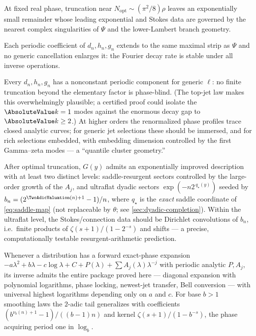 \documentclass[11pt,oneside]{article}
\numberwithin{equation}{section}
\theoremstyle{definition}
\theoremstyle{remark}
\begin{document}
\begin{conjecture}
\label{conj:optimal-truncation}
At fixed real phase, truncation near
$N_{\mathrm{opt}}\sim(\pi^{2}/8)\rho$ leaves an exponentially small
remainder whose leading exponential and Stokes data are governed by
the nearest complex singularities of $\Psi$ and the lower-Lambert
branch geometry.
\end{conjecture}

\begin{conjecture}
\label{conj:strip-sharp}
Each periodic coefficient of $d_n,h_n,g_n$ extends to the same
maximal strip as $\Psi$ and no generic cancellation enlarges it: the
Fourier decay rate is stable under all inverse operations.
\end{conjecture}

\begin{conjecture}
\label{conj:nonconstant-phase}
Every $d_n,h_n,g_n$ has a nonconstant periodic component for generic
$\ell$: no finite truncation beyond the elementary factor is
phase-blind.  (The top-jet law makes this overwhelmingly plausible;
a certified proof could isolate the $\AbsoluteValue k=1$ modes against the
enormous decay gap to $\AbsoluteValue k\ge2$.)  At higher orders the
renormalized phase profiles trace closed analytic curves; for generic
jet selections these should be immersed, and for rich selections
embedded, with embedding dimension controlled by the first
Gamma--zeta modes --- a ``quantile cluster geometry.''
\end{conjecture}

\begin{conjecture}
\label{conj:transseries}
After optimal truncation, $G(y)$ admits an exponentially improved
description with at least two distinct levels: saddle-resurgent
sectors controlled by the large-order growth of the $A_j$, and
ultraflat dyadic sectors
$\exp(-n2^{\,q_\star(y)})$ seeded by
$b_n=(2^{\TwoAdicValuation(n)+1}-1)/n$, where $q_\star$ is the \emph{exact}
saddle coordinate of \eqref{eq:saddle-map} (not replaceable by
$\theta$; see \cref{sec:dyadic-completion}).  Within the ultraflat
level, the Stokes/connection data should be Dirichlet convolutions
of $b_n$, i.e.\ finite products of
$\zeta(s+1)/(1-2^{-s})$ and shifts --- a precise, computationally
testable resurgent-arithmetic prediction.
\end{conjecture}

\begin{conjecture}
\label{conj:universal-class}
Whenever a distribution has a forward exact-phase expansion
$-a\lambda^{2}+b\lambda-c\log\lambda+C+P(\lambda)
+\sum A_j(\lambda)\lambda^{-j}$ with periodic analytic
$P,A_j$, its inverse admits the entire package proved here ---
diagonal expansion with polynomial logarithms, phase locking,
newest-jet transfer, Bell conversion --- with universal highest
logarithms depending only on $a$ and $c$.  For base
$b>1$ smoothing laws the $2$-adic tail generalizes with coefficients
$(b^{\nu_b(n)+1}-1)/((b-1)n)$ and kernel
$\zeta(s+1)/(1-b^{-s})$, the phase acquiring period one in
$\log_b$.
\end{conjecture}
\end{document}
